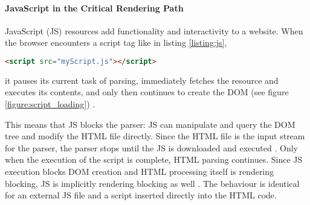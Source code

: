 

\paragraph{JavaScript in the Critical Rendering Path} %


JavaScript (JS) resources add functionality and interactivity to a website.
When the browser encounters a script tag like in listing \ref{listing:js},

\begin{center}
\begin{lstlisting}[caption={Link to a JS file from the main document}, label={listing:js}, language=html, numbers=none]
<script src="myScript.js"></script>
\end{lstlisting}
\end{center}

it pauses its current task of parsing, immediately fetches the resource and executes its contents, and only then continues to create the DOM (see figure \ref{figure:script_loading}) \cite{2013GrigorikFluent}.

This means that JS blocks the parser: JS can manipulate and query the DOM tree and modify the HTML file directly.
Since the HTML file is the input stream for the parser, the parser stops until the JS is downloaded and executed \cite{2021MDNCRP}.
Only when the execution of the script is complete, HTML parsing continues.
Since JS execution blocks DOM creation and HTML processing itself is rendering blocking, JS is implicitly rendering blocking as well \cite{2013GrigorikFluent}.
The behaviour is identical for an external JS file and a script inserted directly into the HTML code.







